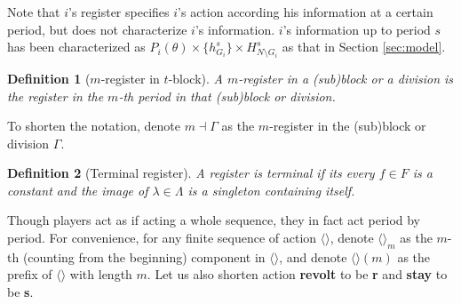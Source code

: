 \documentclass[12pt,letter]{article}
\newcommand{\Kappa}{\mathrm{K}}
\newtheorem{definition}{Definition}[section]
\theoremstyle{definition}
\theoremstyle{remark}
\theoremstyle{claim}
\begin{document}
Note that $i$'s register specifies $i$'s action according his information at a certain period, but does not characterize $i$'s information. $i$'s information up to period $s$ has been characterized as $P_i(\theta)\times \{h^s_{G_i}\}\times H^s_{N\setminus G_i}$ as that in Section \ref{sec:model}. 

\begin{definition}[$m$-register in $t$-block]
A $m$-register in a (sub)block or a division is the register in the $m$-th period in that (sub)block or division.
\end{definition}

To shorten the notation, denote $m\dashv\Gamma$ as the $m$-register in the (sub)block or division $\Gamma$.

\begin{definition}[Terminal register]
A register is terminal if its every $f\in F$ is a constant and the image of $\lambda \in \Lambda$ is a singleton containing itself. 
\end{definition}

Though players act as if acting a whole sequence, they in fact act period by period. For convenience, for any finite sequence of action $\langle \rangle$, denote $\langle \rangle_m$ as the $m$-th (counting from the beginning) component in $\langle \rangle$, and denote $\langle \rangle(m)$ as the prefix of $\langle \rangle$ with length $m$. Let us also shorten action \textbf{revolt} to be \textbf{r} and \textbf{stay} to be \textbf{s}. 
\clearpage
\noindent{\textbf{Equilibrium path in $\Kappa^0$}}
\end{document}
